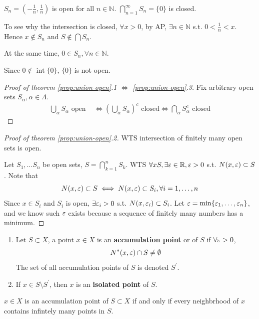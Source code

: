 \begin{example}
    $S_n = \left( - \frac{1}{n}, \frac{1}{n} \right) $ is open for all $n \in \mathbb{N}$. 
    $\bigcap_{n=1}^{\infty} S_n = \{ 0 \} $ is closed. 

    \medskip 

    To see why the intersection is closed, 
    $\forall x >0$, by AP, $\exists n \in \mathbb{N}$ 
    s.t. $0 < \frac{1}{n} < x$. 
    Hence $x \notin S_n$ and 
    $S \notin \bigcap S_n$. 
    \medskip

    At the same time, $0 \in S_n, \forall n \in \mathbb{N}$. 
    \medskip

    Since $0 \notin \operatorname{int} \{ 0 \}  $, $\{ 0 \} $ is not open.
\end{example}


\begin{proof}[Proof of theorem \ref{prop:union-open}.1 $\iff$ \ref{prop:union-open}.3]
    Fix arbitrary open sets $S_{\alpha}, \alpha \in \Lambda$.
    \begin{align*}
        \bigcup_{\alpha} S_{\alpha} \text{ open } &\iff \left( \bigcup_{\alpha} S_{\alpha}\right)^c \text{ closed} \iff \bigcap_{\alpha}S_{\alpha}^c \text{ closed}
    \end{align*}
\end{proof}


\begin{proof}[Proof of theorem \ref{prop:union-open}.2]
    WTS intersection of finitely many open sets is open. 
    \medskip

    Let $S_1, \hdots S_n$ be open sets, $S = \bigcap_{k = 1}^n S_k$. 
    WTS $\forall x S, \exists \varepsilon \in \mathbb{R}, \varepsilon > 0$
    s.t. 
    $N(x , \varepsilon) \subset S$. 
    Note that 
    \[
        N(x, \varepsilon ) \subset S \iff
        N(x, \varepsilon ) \subset S_i, \forall i = 1, \hdots, n
    \]
    Since $x \in S_i$ and $S_i$ is open, $\exists \varepsilon_i > 0$ s.t. 
    $N(x, \varepsilon_i) \subset S_i$. 
    Let $\varepsilon = \min \{ \varepsilon_1, \hdots, \varepsilon_n  \} $,
    and we know such $\varepsilon$ exists 
    because a sequence of finitely many numbers has a minimum.
\end{proof}

\begin{definition}
    \hfill 
    \begin{enumerate}
        \item
    Let $S \subset X$, a point $x \in X$ is an \textbf{accumulation point}
    or 
    of $S$ if $\forall \varepsilon > 0$, 
    \[
        N^*(x, \varepsilon) \cap S \neq \emptyset
    \]
    The set of all accumulation points of $S$ is denoted $S^{\prime}$.
        \item If $x \in S \setminus S^{\prime}$, then $x$ is an 
\textbf{isolated point} of $S$.
    \end{enumerate}
\end{definition}
\begin{remark}
    $x \in X$ is an accumulation point of $S \subset X$ if and only if 
    every neighbrhood of $x$ contains infintely many points in $S$.
\end{remark}

